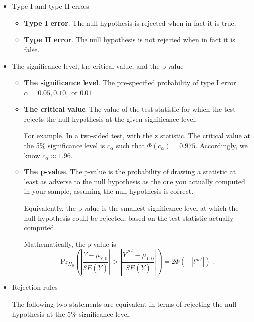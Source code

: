 \documentclass[a4paper,11pt]{article}
\newcommand{\pr}{\mathrm{Pr}}
\begin{document}
\begin{itemize}
\item Type I and type II errors
\label{sec:orgca7f762}

\begin{itemize}
\item \textbf{Type I error}. The null hypothesis is rejected when in fact it is
true.
\item \textbf{Type II error}. The null hypothesis is not rejected when in fact it
is false.
\end{itemize}

\item The significance level, the critical value, and the p-value
\label{sec:org325182d}

\begin{itemize}
\item \textbf{The significance level}. The pre-specified probability of type I
error.  \(\alpha = 0.05, 0.10, \text{ or } 0.01\)

\item \textbf{The critical value}. The value of the test statistic for which the
test rejects the null hypothesis at the given significance level.

For example. In a two-sided test, with the z statistic. The critical
value at the 5\% significance level is \(c_{\alpha}\) such that
\(\varPhi(c_{\alpha}) = 0.975\). Accordingly, we know \(c_{\alpha}
  \approx 1.96\).

\item \textbf{The p-value}. The p-value is the probability of drawing a statistic
at least as adverse to the null hypothesis as the one you actually
computed in your sample, assuming the null hypothesis is
correct. 

Equivalently, the p-value is the smallest significance
level at which the null hypothesis could be rejected, based on the
test statistic actually computed. 

Mathematically, the p-value is 
\[  \pr_{H_0}\left( \left| \frac{\overline{Y} - \mu_{Y,0}}{SE(\overline{Y})}
  \right| > \left| \frac{\overline{Y}^{act} - \mu_{Y,0}}{SE(\overline{Y})} \right| \right) =
  2\varPhi(-|t^{act}|) \text{ .} \]
\end{itemize}

\item Rejection rules
\label{sec:org82ed033}

The following two statements are equivalent in terms of rejecting the
null hypothesis at the 5\% significance level. 


\end{itemize}
\end{document}
